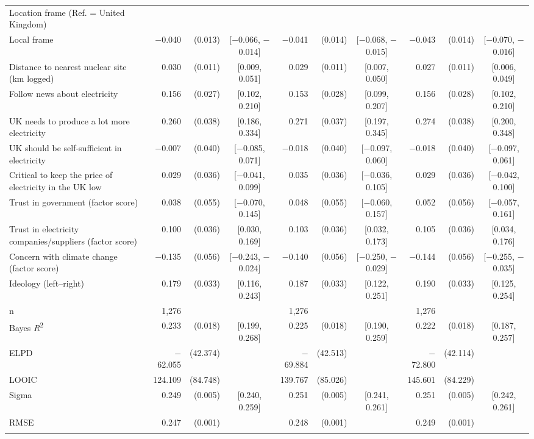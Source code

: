 \begin{landscape}
\begin{longtable}[t]{>{\raggedright\arraybackslash}p{2.8in}rrcrrcrrc}
Location frame (Ref. = United Kingdom) &  &  &  &  &  &  &  &  & \\
\hspace{1em}Local frame & $-$0.040 & (0.013) & {}[$-$0.066, $-$0.014] & $-$0.041 & (0.014) & {}[$-$0.068, $-$0.015] & $-$0.043 & (0.014) & {}[$-$0.070, $-$0.016]\\
Distance to nearest nuclear site (km logged) & 0.030 & (0.011) & {}[0.009, 0.051] & 0.029 & (0.011) & {}[0.007, 0.050] & 0.027 & (0.011) & {}[0.006, 0.049]\\
Follow news about electricity & 0.156 & (0.027) & {}[0.102, 0.210] & 0.153 & (0.028) & {}[0.099, 0.207] & 0.156 & (0.028) & {}[0.102, 0.210]\\
UK needs to produce a lot more electricity & 0.260 & (0.038) & {}[0.186, 0.334] & 0.271 & (0.037) & {}[0.197, 0.345] & 0.274 & (0.038) & {}[0.200, 0.348]\\
UK should be self-sufficient in electricity & $-$0.007 & (0.040) & {}[$-$0.085, 0.071] & $-$0.018 & (0.040) & {}[$-$0.097, 0.060] & $-$0.018 & (0.040) & {}[$-$0.097, 0.061]\\
Critical to keep the price of electricity in the UK low & 0.029 & (0.036) & {}[$-$0.041, 0.099] & 0.035 & (0.036) & {}[$-$0.036, 0.105] & 0.029 & (0.036) & {}[$-$0.042, 0.100]\\
Trust in government (factor score) & 0.038 & (0.055) & {}[$-$0.070, 0.145] & 0.048 & (0.055) & {}[$-$0.060, 0.157] & 0.052 & (0.056) & {}[$-$0.057, 0.161]\\
Trust in electricity companies/suppliers (factor score) & 0.100 & (0.036) & {}[0.030, 0.169] & 0.103 & (0.036) & {}[0.032, 0.173] & 0.105 & (0.036) & {}[0.034, 0.176]\\
Concern with climate change (factor score) & $-$0.135 & (0.056) & {}[$-$0.243, $-$0.024] & $-$0.140 & (0.056) & {}[$-$0.250, $-$0.029] & $-$0.144 & (0.056) & {}[$-$0.255, $-$0.035]\\
Ideology (left--right) & 0.179 & (0.033) & {}[0.116, 0.243] & 0.187 & (0.033) & {}[0.122, 0.251] & 0.190 & (0.033) & {}[0.125, 0.254]\\
\midrule
n & 1,276 &  &  & 1,276 &  &  & 1,276 &  & \\
Bayes \textit{R}\textsuperscript{2} & 0.233 & (0.018) & {}[0.199, 0.268] & 0.225 & (0.018) & {}[0.190, 0.259] & 0.222 & (0.018) & {}[0.187, 0.257]\\
ELPD & $-$62.055 & (42.374) &  & $-$69.884 & (42.513) &  & $-$72.800 & (42.114) & \\
LOOIC & 124.109 & (84.748) &  & 139.767 & (85.026) &  & 145.601 & (84.229) & \\
Sigma & 0.249 & (0.005) & {}[0.240, 0.259] & 0.251 & (0.005) & {}[0.241, 0.261] & 0.251 & (0.005) & {}[0.242, 0.261]\\
RMSE & 0.247 & (0.001) &  & 0.248 & (0.001) &  & 0.249 & (0.001) & \\*
\end{longtable}


\end{landscape}
